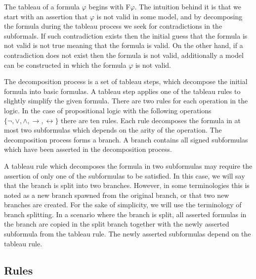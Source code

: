 \documentclass{article}
\begin{document}
The tableau of a formula $\varphi$ begins with F$\varphi$. The intuition behind it is that we start with an assertion that $\varphi$ is not valid in some model, and by decomposing the formula during the tableau process we seek for contradictions in the subformals. If such contradiction exists then the initial guess that the formula is not valid is not true meaning that the formula is valid. On the other hand, if a contradiction does not exist then the formula is not valid, additionally  a model can be constructed in which the formula $\varphi$ is not valid.

The decomposition process is a set of tableau steps, which decompose the initial formula into basic formulas. A tableau step applies one of the tableau rules to slightly simplify the given formula. There are two rules for each operation in the logic. In the case of propositional logic with the following operations $\{ \neg, \vee, \wedge, \rightarrow, \leftrightarrow \}$ there are ten rules. Each rule decomposes the formula in at most two subformulas which depends on the arity of the operation. The decomposition process forms a branch. A branch contains all signed subformulas which have been asserted in the decomposition process.

A tableau rule which decomposes the formula in two subformulas may require the assertion of only one of the subformulas to be satisfied. In this case, we will say that the branch is split into two branches. However, in some terminologies this is noted as a new branch spawned from the original branch, or that two new branches are created. For the sake of simplicity, we will use the terminology of branch splitting. In a scenario where the branch is split, all asserted formulas in the branch are copied in the split branch together with the newly asserted subformula from the tableau rule. The newly asserted subformulas depend on the tableau rule.

	\subsection{Rules}
\end{document}
